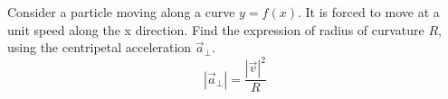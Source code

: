 \begin{problem}
    Consider a particle moving along a curve \( y=f\left(x\right) \). It is forced to move at a unit speed along the x direction. Find the expression of radius of curvature \( R \), using the centripetal acceleration \( \vec{a}_{\perp} \).
    \[ |\vec{a}_{\perp}|=\frac{|\vec{v}|^2}{R}\]
\end{problem}

